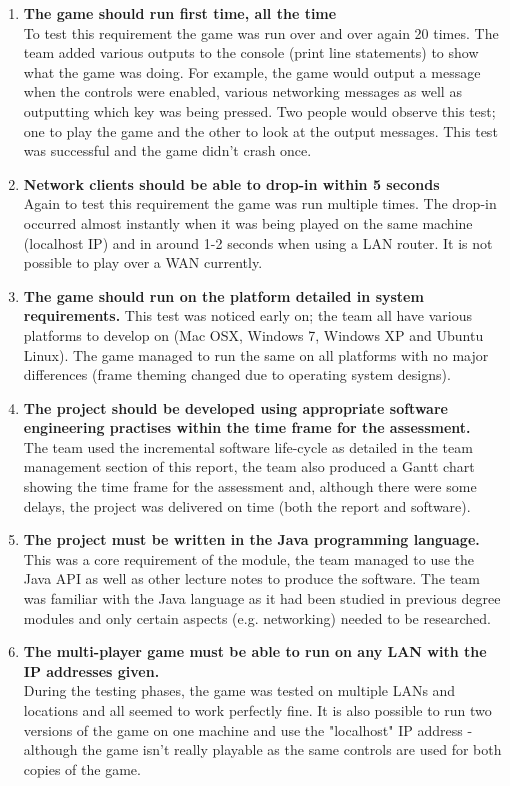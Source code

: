 \begin{enumerate}
\item \textbf{The game should run first time, all the time}\\
To test this requirement the game was run over and over again 20 times. The team added various outputs to the console (print line statements) to show what the game was doing. For example, the game would output a message when the controls were enabled, various networking messages as well as outputting which key was being pressed. Two people would observe this test; one to play the game and the other to look at the output messages. This test was successful and the game didn't crash once.
\item \textbf{Network clients should be able to drop-in within 5 seconds}\\
Again to test this requirement the game was run multiple times. The drop-in occurred almost instantly when it was being played on the same machine (localhost IP) and in around 1-2 seconds when using a LAN router. It is not possible to play over a WAN currently.
\item \textbf{The game should run on the platform detailed in system requirements.}
This test was noticed early on; the team all have various platforms to develop on (Mac OSX, Windows 7, Windows XP and Ubuntu Linux). The game managed to run the same on all platforms with no major differences (frame theming changed due to operating system designs).
\item \textbf{The project should be developed using appropriate software engineering practises within the time frame for the assessment.}\\The team used the incremental software life-cycle as detailed in the team management section of this report, the team also produced a Gantt chart showing the time frame for the assessment and, although there were some delays, the project was delivered on time (both the report and software).
\item \textbf{The project must be written in the Java programming language.}\\
This was a core requirement of the module, the team managed to use the Java API as well as other lecture notes to produce the software. The team was familiar with the Java language as it had been studied in previous degree modules and only certain aspects (e.g. networking) needed to be researched.
\item \textbf{The multi-player game must be able to run on any LAN with the IP addresses given.}\\
During the testing phases, the game was tested on multiple LANs and locations and all seemed to work perfectly fine. It is also possible to run two versions of the game on one machine and use the "localhost" IP address - although the game isn't really playable as the same controls are used for both copies of the game.

\end{enumerate}
